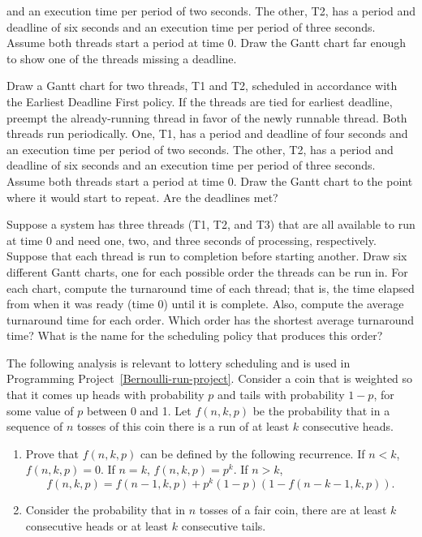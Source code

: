 \begin{chapterEnumerate}
and an execution time per period of two seconds.  The other, T2, has a
period and deadline of six seconds and an execution time per period
of three seconds.  Assume both threads start a period at time 0.  Draw
the Gantt chart far enough to show one of the threads missing a deadline.
\item\label{Gantt-EDF-exercise}
Draw a Gantt chart for two threads, T1 and T2, scheduled in accordance
with the Earliest Deadline First policy.  If the threads are tied for
earliest deadline, preempt the already-running thread in favor of the
newly runnable thread.  Both threads run periodically.  One, T1, has a
period and deadline of four seconds and an execution time per
period of two seconds.  The other, T2, has a period and deadline of
six seconds and an execution time per period of three seconds.
Assume both threads start a period at time 0.  Draw the Gantt chart
to the point where it would start to repeat.  Are the deadlines met?
\item\label{Gantt-SJF-exercise}
Suppose a system has three threads (T1, T2, and T3) that are all
available to run at time 0 and need one,
two, and three seconds of processing, respectively.  Suppose that each
thread is run to completion before starting another. Draw six different
Gantt charts, one for each possible order the threads can be run in.
For each chart, compute the turnaround time of each thread; that is,
the time elapsed from when it was ready (time 0) until it is
complete.  Also, compute the average turnaround time for each order.
Which order has the shortest average turnaround time?  What is the
name for the scheduling policy that produces this order?
\item\label{Bernoulli-run-exercise}
The following analysis is relevant to lottery scheduling and is
used in Programming Project~\ref{Bernoulli-run-project}.
Consider a coin that is weighted so that it comes up heads with
probability $p$ and tails with probability $1-p$, for some value of
$p$ between 0 and 1.  Let $f(n,k,p)$ be the probability that in a
sequence of $n$ tosses of this coin there is a run of at least $k$
consecutive heads.
\begin{enumerate}
\item
Prove that $f(n,k,p)$ can be defined by the following recurrence.  If
$n<k$, $f(n,k,p) = 0$.  If $n=k$, $f(n,k,p) = p^k$.  If $n>k$,
\[f(n,k,p) = f(n-1,k,p)+p^k(1-p)(1-f(n-k-1,k,p)).\]
\item
Consider the
probability that in $n$ tosses of a fair coin, there are at least $k$
consecutive heads or at least $k$ consecutive tails.

\end{enumerate}
\end{chapterEnumerate}
